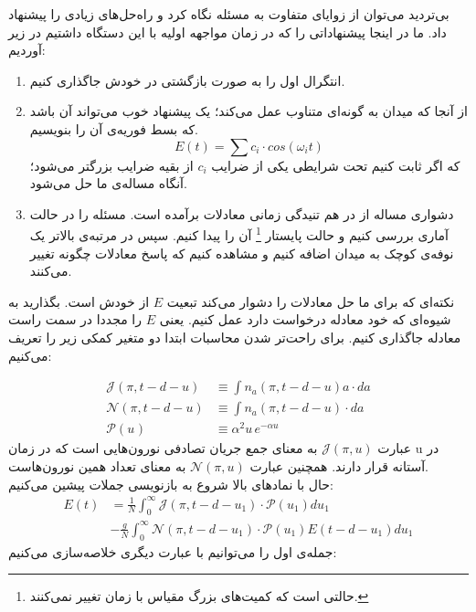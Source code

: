 بی‌تردید می‌توان از زوایای متفاوت به مسئله نگاه کرد و راه‌حل‌های زیادی را پیشنهاد داد. ما در اینجا پیشنهاداتی را که در زمان مواجهه اولیه با این دستگاه داشتیم در زیر آوردیم:
\begin{enumerate}[1.]
	\item
انتگرال اول را به صورت بازگشتی در خودش جاگذاری کنیم.
	\item
	از آنجا که میدان به گونه‌ای متناوب عمل می‌کند؛ یک پیشنهاد خوب می‌تواند آن باشد که بسط فوریه‌ی آن را بنویسیم.
	\begin{equation}
		E(t) = \sum c_i \cdot cos(\omega_i t)
	\end{equation}
	که اگر ثابت کنیم تحت شرایطی یکی از ضرایب
	 $c_i$
	 از بقیه ضرایب بزرگتر می‌شود؛ آنگاه مساله‌ی ما حل می‌شود.
	\item
	دشواری مساله از در هم تنیدگی زمانی معادلات برآمده است. مسئله را در حالت آماری بررسی کنیم و حالت پایستار 
	\footnote{حالتی است که کمیت‌های بزرگ مقیاس با زمان تغییر نمی‌کنند.}
	آن را پیدا کنیم. سپس در مرتبه‌ی بالاتر یک نوفه‌ی کوچک به میدان اضافه کنیم و مشاهده کنیم که پاسخ معادلات چگونه تغییر می‌کنند.
\end{enumerate}



نکته‌ای که برای ما حل معادلات را دشوار می‌کند تبعیت $E$ از خودش است. بگذارید به شیوه‌ای که خود معادله درخواست دارد عمل کنیم. یعنی $E$ را مجددا در سمت راست معادله جاگذاری کنیم. برای راحت‌تر شدن محاسبات ابتدا دو متغیر کمکی زیر را تعریف می‌کنیم:
\newcommand{\J}[1]{\mathcal{J}(\pi,#1)}
\newcommand{\N}[1]{\mathcal{N}(\pi, #1)}
\newcommand{\Pexp}[1]{\mathcal{P}(u_{#1})}

\newcommand{\A}[1]{\mathcal{A}(#1)}

%
\begin{align}
	\J{t-d-u} &\equiv \int n_a(\pi,t-d-u) a \cdot da\\
	\N{t-d-u} &\equiv \int n_a(\pi,t-d-u) \cdot da\\
	\Pexp{} &\equiv \alpha^2 u\, e^{-\alpha u}
\end{align}
عبارت $\J{u}$ به معنای جمع جریان تصادفی نورون‌هایی است که در زمان u در آستانه قرار دارند. همچنین عبارت $\N{u}$ به معنای تعداد همین نورون‌هاست.\\
حال با نمادهای بالا شروع به بازنویسی جملات پیشین می‌کنیم:
\begin{align}
	E(t) &= \frac{1}{N} \int_{0}^{\infty} \J{t-d-u_1} \cdot \Pexp{1} du_1\\
	 &-\frac{g}{N}\int_{0}^{\infty} \N{t-d-u_1} \cdot \Pexp{1} E(t-d-u_1)  du_1
	 \label{eq:field_zeroth_step}
\end{align}
 جمله‌ی اول را می‌توانیم با عبارت دیگری خلاصه‌سازی می‌کنیم:

